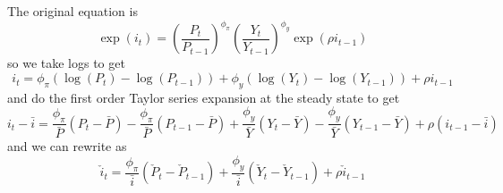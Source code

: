 \documentclass[11pt]{amsart}
\begin{document}
\subsection{}

\subsection{}

\subsection{}
The original equation is
\[
\exp(i_t) = \left(\frac{P_t}{P_{t-1}} \right)^{\phi_{\pi}} \left(\frac{Y_t}{Y_{t-1}} \right)^{\phi_y} \exp(\rho i_{t-1})
\]
so we take logs to get
\[
i_t = \phi_{\pi}(\log(P_t) - \log(P_{t-1})) + \phi_y (\log(Y_t) - \log(Y_{t-1})) + \rho i_{t-1}
\]
and do the first order Taylor series expansion at the steady state to get
\[
i_t - \bar{i} = \frac{\phi_{\pi}}{\bar{P}} (P_t - \bar{P}) - \frac{\phi_{\pi}}{\bar{P}} (P_{t-1} - \bar{P}) +\frac{\phi_y}{\bar{Y}} (Y_t - \bar{Y}) - \frac{\phi_y}{\bar{Y}} (Y_{t-1} - \bar{Y}) + \rho(i_{t-1} - \bar{i})
\]
and we can rewrite as 
\[
\check{i}_t = \frac{\phi_{\pi}}{\bar{i}} (\check{P}_t - \check{P}_{t-1})  +\frac{\phi_y}{\bar{i}} (\check{Y}_t - \check{Y}_{t-1}) + \rho \check{i}_{t-1}
\]

\subsection{}

\subsection{}
\end{document}
